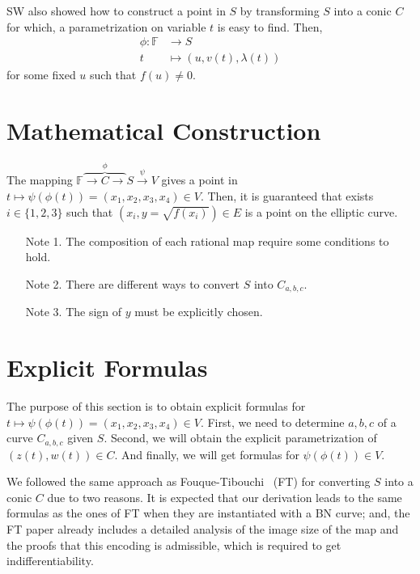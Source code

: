 \documentclass[letterpaper,11pt]{article}
\begin{document}
SW also showed how to construct a point in $S$ by transforming $S$ into a conic $C$ for which, a parametrization on variable $t$ is easy to find.
Then, 
\begin{equation}
 \begin{aligned}
  \phi \colon \mathbb{F} &\rightarrow S\\
   t &\mapsto (u,v(t),\lambda(t))
 \end{aligned}
\end{equation}
for some fixed $u$ such that $f(u)\neq 0$.


\section{Mathematical Construction}

The mapping $\mathbb{F}\overbrace{\rightarrow C\rightarrow}^\phi S \xrightarrow{\psi} V$ gives a point in $t\mapsto\psi(\phi(t))=(x_1,x_2,x_3,x_4)\in V$. Then, it is guaranteed that exists $i\in\{1,2,3\}$ such that $(x_i,y=\sqrt{f(x_i)})\in E$ is a point on the elliptic curve.
\begin{itemize}
 \item[Note 1.] The composition of each rational map require some conditions to hold.
\item[Note 2.] There are different ways to convert $S$ into $C_{a,b,c}$.
\item[Note 3.] The sign of $y$ must be explicitly chosen.
\end{itemize}

\section{Explicit Formulas}

The purpose of this section is to obtain explicit formulas for $t\mapsto\psi(\phi(t))=(x_1,x_2,x_3,x_4)\in V$. 
First, we need to determine $a,b,c$ of a curve $C_{a,b,c}$ given $S$. Second, we will obtain the explicit parametrization of $(z(t),w(t))\in C$. And finally, we will get  formulas for $\psi(\phi(t))\in V$.

We followed the same approach as Fouque-Tibouchi~\cite{ft2012} (FT) for converting $S$ into a conic $C$ due to two reasons. It is expected that our derivation leads to the same formulas as the ones of FT when they are instantiated with a BN curve; and, the FT paper  already includes a detailed analysis of the image size of the map and the proofs that this encoding is admissible, which is required to get indifferentiability.
\end{document}
